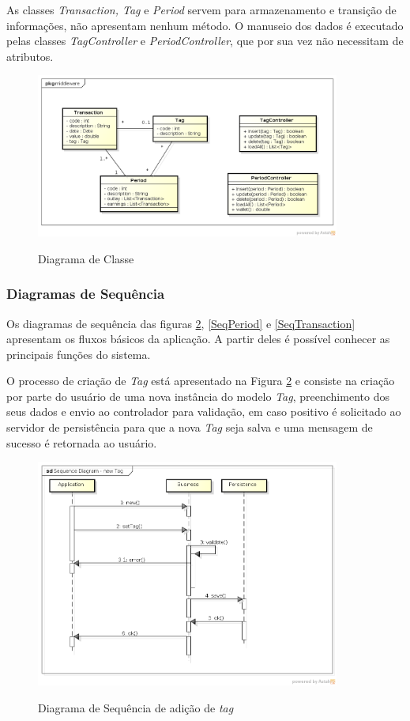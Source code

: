 As classes \textit{Transaction, Tag} e \textit{Period} servem para armazenamento e transição de informações, não apresentam nenhum método. O manuseio dos dados é executado pelas classes \textit{TagController} e \textit{PeriodController}, que por sua vez não necessitam de atributos.

\begin{figure}[!htb]
	\caption{Diagrama de Classe}
	{\parbox{6cm}{
			\includegraphics[width=10cm]{images/ClassDiagram.png}
			\label{Diagrama-Classe}
	}}
\end{figure}

\subsubsection{Diagramas de Sequência}
Os diagramas de sequência das figuras \ref{SeqTag}, \ref{SeqPeriod} e \ref{SeqTransaction} apresentam os fluxos básicos da aplicação. A partir deles é possível conhecer as principais funções do sistema.

O processo de criação de \textit{Tag} está apresentado na Figura \ref{SeqTag} e consiste na criação por parte do usuário de uma nova instância do modelo \textit{Tag}, preenchimento dos seus dados e envio ao controlador para validação, em caso positivo é solicitado ao servidor de persistência para que a nova \textit{Tag} seja salva e uma mensagem de sucesso é retornada ao usuário.

\begin{figure}[!htb]
	\caption{Diagrama de Sequência de adição de \textit{tag}}
	{\parbox{6cm}{
			\includegraphics[width=10cm]{images/SequenceDiagramNewTag.png}
			\label{SeqTag}
	}}
\end{figure}

